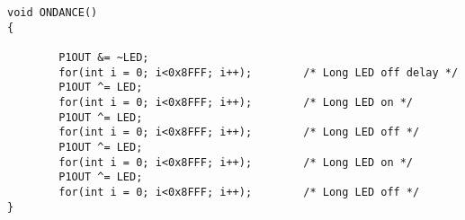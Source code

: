 \begin{lstlisting}[caption=Main.c,label=Code4]
void ONDANCE()
{
  
        P1OUT &= ~LED;
        for(int i = 0; i<0x8FFF; i++);        /* Long LED off delay */
        P1OUT ^= LED;
        for(int i = 0; i<0x8FFF; i++);        /* Long LED on */
        P1OUT ^= LED;
        for(int i = 0; i<0x8FFF; i++);        /* Long LED off */
        P1OUT ^= LED;
        for(int i = 0; i<0x8FFF; i++);        /* Long LED on */
        P1OUT ^= LED;
        for(int i = 0; i<0x8FFF; i++);        /* Long LED off */  
}
\end{lstlisting}